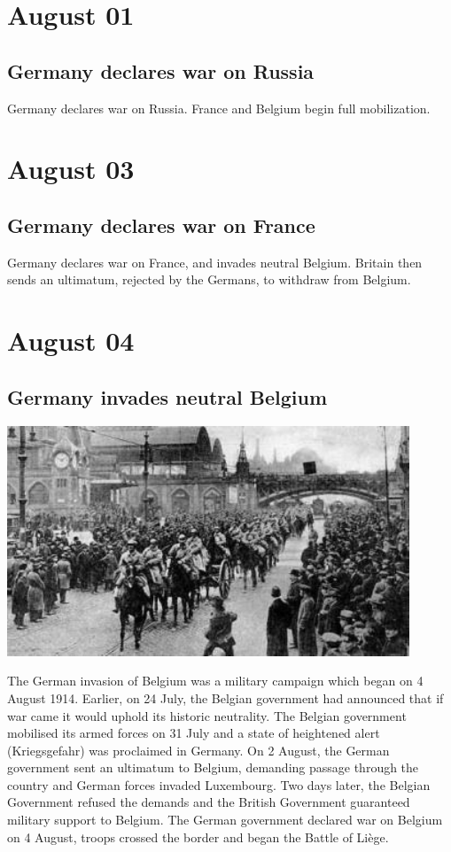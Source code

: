 \documentclass[11pt]{report}
\begin{document}
\section{August 01}
\subsection{Germany declares war on Russia}
Germany declares war on Russia. France and Belgium begin full mobilization.
\section{August 03}
\subsection{Germany declares war on France}
Germany declares war on France, and invades neutral Belgium. Britain then sends an ultimatum, rejected by the Germans, to withdraw from Belgium.
\section{August 04}
\subsection{Germany invades neutral Belgium}
\vspace{2mm}\begin{center}\includegraphics[width=12cm]{./img/germanyInBelgium.jpg}\end{center}
The German invasion of Belgium was a military campaign which began on 4 August 1914. Earlier, on 24 July, the Belgian government had announced that if war came it would uphold its historic neutrality. The Belgian government mobilised its armed forces on 31 July and a state of heightened alert (Kriegsgefahr) was proclaimed in Germany. On 2 August, the German government sent an ultimatum to Belgium, demanding passage through the country and German forces invaded Luxembourg. Two days later, the Belgian Government refused the demands and the British Government guaranteed military support to Belgium. The German government declared war on Belgium on 4 August, troops crossed the border and began the Battle of Liège.
\end{document}
